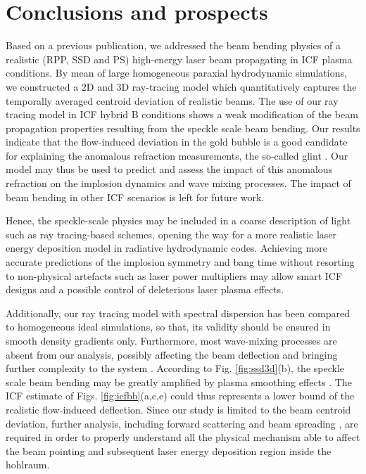 \documentclass[%
 reprint,
 amsmath,amssymb,
 aps,
]{revtex4-1}
\begin{document}
\section{Conclusions and prospects}
Based on a previous publication, we addressed the beam bending physics of a realistic (RPP, SSD and PS) high-energy laser beam  propagating in  ICF plasma conditions. 
By mean of large homogeneous paraxial hydrodynamic simulations, we constructed a 2D and 3D ray-tracing model which  quantitatively captures the temporally averaged  centroid deviation  of realistic  beams.
The use of our ray tracing model in ICF hybrid B conditions shows a weak modification of the beam propagation properties  resulting from the speckle scale beam bending. Our results  indicate that the flow-induced deviation in the gold bubble is a good  candidate for explaining the anomalous refraction measurements, the so-called  glint \cite[]{Honda_1998,PRL_Turnbull_2015}. Our model may thus be used to predict and assess the impact of this anomalous refraction on the implosion dynamics and wave mixing processes. 
The impact of beam bending in other ICF scenarios is left for future work. 

Hence, the speckle-scale physics  may be included in a coarse description of light such as  ray tracing-based schemes, opening the way for a more realistic laser energy deposition model in radiative hydrodynamic codes.
Achieving more accurate predictions of the implosion symmetry and bang time without resorting to non-physical artefacts such as laser power multipliers \cite[]{POP_Kritcher_2018} may allow   smart ICF designs \cite[]{POP_Vandenboomgaerde_2018,PRL_Depierreux_2020} and a possible control of deleterious laser plasma effects.

Additionally, our ray tracing model with spectral dispersion has been compared to   homogeneous ideal simulations, so that, its   validity should be ensured in   smooth density gradients only. 
Furthermore, most wave-mixing processes are absent from our analysis, possibly affecting the beam deflection and bringing further complexity to the system \cite[]{POP_Huller_2020}. 
According to Fig. \ref{fig:ssd3d}(b), the speckle scale beam bending may  be greatly amplified by plasma smoothing effects \cite[]{POP_Maximov_2001,POP_Yahia_2015}. 
The ICF estimate of Figs. \ref{fig:icfbb}(a,c,e) could thus represents a lower bound of the realistic flow-induced deflection.
Since our study is limited to the beam centroid deviation, further analysis, including forward scattering and beam spreading \cite[]{PRL_Grech_2009,POP_Hinkel_1998}, are required in order to properly understand all the physical mechanism able to affect the beam pointing and subsequent laser energy deposition region inside the hohlraum.
\end{document}
